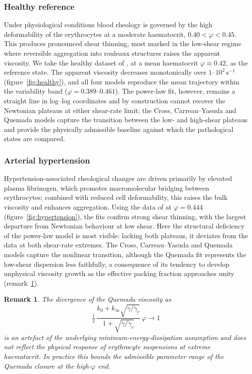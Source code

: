 \documentclass[lineno]{jfm}
\newtheorem{remark}{Remark}
\begin{document}
{\subsubsection{Healthy reference}
Under physiological conditions blood rheology is governed by the high
deformability of the erythrocytes at a moderate haematocrit,
$0.40<\varphi<0.45$. This produces pronounced shear thinning, most marked in the
low-shear regime where reversible aggregation into rouleaux structures raises
the apparent viscosity. We take the healthy dataset of \cite{cho2008hemorheological}, at a
mean haematocrit $\varphi\approx0.42$, as the reference state. The apparent
viscosity decreases monotonically over $1$--$10^2\,\mathrm{s}^{-1}$
(figure~\ref{fig:healthy}), and all four models reproduce the mean trajectory
within the variability band ($\varphi=0.389$--$0.461$). The power-law fit, however,
remains a straight line in log--log coordinates and by construction cannot
recover the Newtonian plateaus at either shear-rate limit; the Cross,
Carreau--Yasuda and Quemada models capture the transition between the low- and
high-shear plateaus and provide the physically admissible baseline against which
the pathological states are compared.

\subsubsection{Arterial hypertension}
Hypertension-associated rheological changes are driven primarily by elevated
plasma fibrinogen, which promotes macromolecular bridging between erythrocytes;
combined with reduced cell deformability, this raises the bulk viscosity and
enhances aggregation. Using the data of \cite{Letcher1981} at $\varphi=0.444$
(figure~\ref{fig:hypertension}), the fits confirm strong shear thinning, with
the largest departure from Newtonian behaviour at low shear. Here the structural
deficiency of the power-law model is most visible: lacking both plateaus, it
deviates from the data at both shear-rate extremes. The Cross, Carreau--Yasuda
and Quemada models capture the nonlinear transition, although the Quemada fit
represents the low-shear dispersion less faithfully, a consequence of its
tendency to develop unphysical viscosity growth as the effective packing
fraction approaches unity (remark~\ref{rmk:quemada}).

\begin{remark}
\label{rmk:quemada}
The divergence of the Quemada viscosity as
\[
\tfrac{1}{2}\,
\frac{k_0+k_\infty\sqrt{\dot\gamma/\dot\gamma_c}}
{1+\sqrt{\dot\gamma/\dot\gamma_c}}\,\varphi \to 1
\]
is an artefact of the underlying minimum-energy-dissipation assumption and does
not reflect the physical response of erythrocyte suspensions at extreme
haematocrit. In practice this bounds the admissible parameter range of the
Quemada closure at the high-$\varphi$ end.
\end{remark}

}
\end{document}
